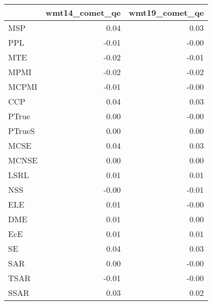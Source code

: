 \begin{tabular}{lrr}
\toprule
 & wmt14\_comet\_qe & wmt19\_comet\_qe \\
\midrule
MSP & 0.04 & 0.03 \\
PPL & -0.01 & -0.00 \\
MTE & -0.02 & -0.01 \\
MPMI & -0.02 & -0.02 \\
MCPMI & -0.01 & -0.00 \\
CCP & 0.04 & 0.03 \\
PTrue & 0.00 & -0.00 \\
PTrueS & 0.00 & 0.00 \\
MCSE & 0.04 & 0.03 \\
MCNSE & 0.00 & 0.00 \\
LSRL & 0.01 & 0.01 \\
NSS & -0.00 & -0.01 \\
ELE & 0.01 & -0.00 \\
DME & 0.01 & 0.00 \\
EcE & 0.01 & 0.01 \\
SE & 0.04 & 0.03 \\
SAR & 0.00 & -0.00 \\
TSAR & -0.01 & -0.00 \\
SSAR & 0.03 & 0.02 \\
\bottomrule
\end{tabular}
